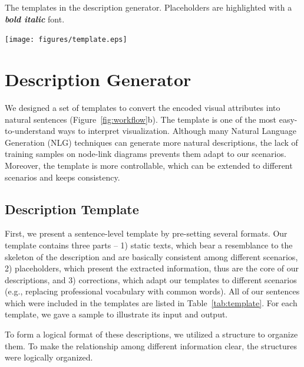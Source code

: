
\begin{table}[th]
\normalsize
\centering
\caption{The templates in the description generator. Placeholders are highlighted with a \textbf{\textit{bold italic}} font.}\label{tab:template}
\texttt{[image: figures/template.eps]}
\vspace{-10pt}
\end{table}

\section{Description Generator} \label{sec:generator}

%

We designed a set of templates to convert the encoded visual attributes into natural sentences (Figure~\ref{fig:workflow}b). The template is one of the most easy-to-understand ways to interpret visualization. Although many Natural Language Generation (NLG) techniques can generate more natural descriptions, the lack of training samples on node-link diagrams prevents them adapt to our scenarios. Moreover, the template is more controllable, which can be extended to different scenarios and keeps consistency.

\subsection{Description Template}

First, we present a sentence-level template by pre-setting several formats. Our template contains three parts -- 1) static texts, which bear a resemblance to the skeleton of the description and are basically consistent among different scenarios, 2) placeholders, which present the extracted information, thus are the core of our descriptions, and 3) corrections, which adapt our templates to different scenarios (e.g., replacing professional vocabulary with common words). All of our sentences which were included in the templates are listed in Table~\ref{tab:template}. For each template, we gave a sample to illustrate its input and output.

To form a logical format of these descriptions, we utilized a structure to organize them. To make the relationship among different information clear, the structures were logically organized. 

